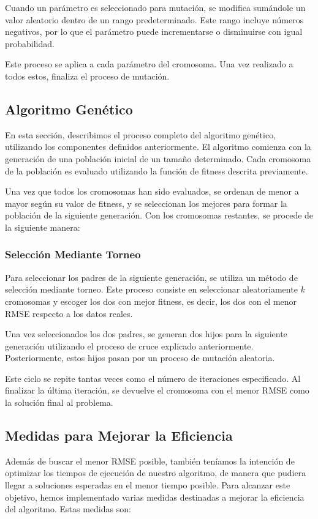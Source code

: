 \documentclass[conference,a4paper]{IEEEtran}
\begin{document}
Cuando un parámetro es seleccionado para mutación, se modifica sumándole un valor aleatorio dentro de un rango predeterminado. Este rango incluye números negativos, por lo que el parámetro puede incrementarse o disminuirse con igual probabilidad. 

Este proceso se aplica a cada parámetro del cromosoma. Una vez realizado a todos estos, finaliza el proceso de mutación.


\subsection{Algoritmo Genético}
En esta sección, describimos el proceso completo del algoritmo genético, utilizando los componentes definidos anteriormente. El algoritmo comienza con la generación de una población inicial de un tamaño determinado. Cada cromosoma de la población es evaluado utilizando la función de fitness descrita previamente.

Una vez que todos los cromosomas han sido evaluados, se ordenan de menor a mayor según su valor de fitness, y se seleccionan los mejores para formar la población de la siguiente generación. Con los cromosomas restantes, se procede de la siguiente manera:

\subsubsection{Selección Mediante Torneo}
Para seleccionar los padres de la siguiente generación, se utiliza un método de selección mediante torneo. Este proceso consiste en seleccionar aleatoriamente \(k\) cromosomas y escoger los dos con mejor fitness, es decir, los dos con el menor RMSE respecto a los datos reales.

Una vez seleccionados los dos padres, se generan dos hijos para la siguiente generación utilizando el proceso de cruce explicado anteriormente. Posteriormente, estos hijos pasan por un proceso de mutación aleatoria. 

Este ciclo se repite tantas veces como el número de iteraciones especificado. Al finalizar la última iteración, se devuelve el cromosoma con el menor RMSE como la solución final al problema.


\subsection{Medidas para Mejorar la Eficiencia}
Además de buscar el menor RMSE posible, también teníamos la intención de optimizar los tiempos de ejecución de nuestro algoritmo, de manera que pudiera llegar a soluciones esperadas en el menor tiempo posible. Para alcanzar este objetivo, hemos implementado varias medidas destinadas a mejorar la eficiencia del algoritmo. Estas medidas son:
\end{document}
